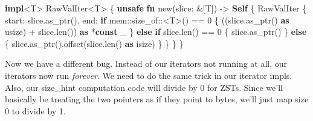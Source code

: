 \documentclass[a4paper,]{book}
\newenvironment{Shaded}{\begin{snugshade}}{\end{snugshade}}
\newcommand{\KeywordTok}[1]{\textcolor[rgb]{0.13,0.29,0.53}{\textbf{{#1}}}}
\newcommand{\DataTypeTok}[1]{\textcolor[rgb]{0.13,0.29,0.53}{{#1}}}
\newcommand{\DecValTok}[1]{\textcolor[rgb]{0.00,0.00,0.81}{{#1}}}
\newcommand{\NormalTok}[1]{{#1}}
\begin{document}
\begin{Shaded}
\begin{Highlighting}[]
\KeywordTok{impl}\NormalTok{<T> RawValIter<T> \{}
    \KeywordTok{unsafe} \KeywordTok{fn} \NormalTok{new(slice: &[T]) -> }\KeywordTok{Self} \NormalTok{\{}
        \NormalTok{RawValIter \{}
            \NormalTok{start: slice.as_ptr(),}
            \NormalTok{end: }\KeywordTok{if} \NormalTok{mem::size_of::<T>() == }\DecValTok{0} \NormalTok{\{}
                \NormalTok{((slice.as_ptr() }\KeywordTok{as} \DataTypeTok{usize}\NormalTok{) + slice.len()) }\KeywordTok{as} \NormalTok{*}\KeywordTok{const} \NormalTok{_}
            \NormalTok{\} }\KeywordTok{else} \KeywordTok{if} \NormalTok{slice.len() == }\DecValTok{0} \NormalTok{\{}
                \NormalTok{slice.as_ptr()}
            \NormalTok{\} }\KeywordTok{else} \NormalTok{\{}
                \NormalTok{slice.as_ptr().offset(slice.len() }\KeywordTok{as} \DataTypeTok{isize}\NormalTok{)}
            \NormalTok{\}}
        \NormalTok{\}}
    \NormalTok{\}}
\NormalTok{\}}
\end{Highlighting}
\end{Shaded}

Now we have a different bug. Instead of our iterators not running at
all, our iterators now run \emph{forever}. We need to do the same trick
in our iterator impls. Also, our size\_hint computation code will divide
by 0 for ZSTs. Since we'll basically be treating the two pointers as if
they point to bytes, we'll just map size 0 to divide by 1.
\end{document}
